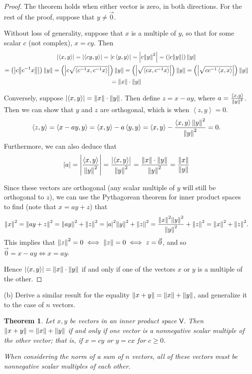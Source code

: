 \documentclass[11pt]{article}
\newcommand{\br}[1]{\left(#1\right)}
\newcommand{\abr}[1]{\left\langle#1\right\rangle}
\newtheorem*{theorem*}{Theorem}
\begin{document}
\begin{proof}
  The theorem holds when either vector is zero, in both directions. For the rest of the proof, suppose that $y\neq \vec{0}$.

  Without loss of generality, suppose that $x$ is a multiple of $y$, so that for some scalar $c$ (not complex), $x=cy$. Then \begin{multline*}\abs{\abr{x,y}} = \abs{\abr{cy,y}} = \abs{c\abr{y,y}} = \abs{c\norm{y}^2} = \br{\abs{c\norm{y}}}\norm{y} \\=\br{\abs{c\norm{c^{-1}x}}}\norm{y} = \br{\abs{c\sqrt{\abr{c^{-1}x, c^{-1}x}}}}\norm{y} = \br{\abs{\sqrt{\abr{cx, c^{-1}x}}}}\norm{y} = \br{\abs{\sqrt{cc^{-1}\abr{x, x}}}}\norm{y} \\ = \norm{x}\cdot \norm{y} \end{multline*}

  Conversely, suppose $\abs{\abr{x,y}} = \norm{x}\cdot \norm{y}$. Then define $z = x-ay$, where $a = \frac{\abr{x,y}}{\norm{y}^2}$. Then we can show that $y$ and $z$ are orthogonal, which is when $\abr{z,y} = 0$. $$\abr{z,y} = \abr{x-ay,y} = \abr{x,y} - a\abr{y,y} = \abr{x,y}-\frac{\abr{x,y}\norm{y}^2}{\norm{y}^2} = 0.$$ Furthermore, we can also deduce that $$\abs{a} = \abs{\frac{\abr{x,y}}{\norm{y}^2}} = \frac{\abs{\abr{x,y}}}{\norm{y}^2} = \frac{\norm{x}\cdot \norm{y}}{\norm{y}^2} = \frac{\norm{x}}{\norm{y}}$$ 
  
  Since these vectors are orthogonal (any scalar multiple of $y$ will still be orthogonal to $z$), we can use the Pythagorean theorem for inner product spaces to find (note that $x = ay+z$) that $$\norm{x}^2 = \norm{ay+z}^2 = \norm{ay}^2 + \norm{z}^2 = \abs{a}^2\norm{y}^2 + \norm{z}^2 = \frac{\norm{x}^2\norm{y}^2}{\norm{y}^2} + \norm{z}^2 = \norm{x}^2 + \norm{z}^2.$$ This implies that $\norm{z}^2 = 0 \iff \norm{z} = 0 \iff z = \vec{0}$, and so $\vec{0} = x-ay \iff x = ay$.

  Hence $\abs{\abr{x,y}} = \norm{x}\cdot \norm{y}$ if and only if one of the vectors $x$ or $y$ is a multiple of the other.
\end{proof}

(b) Derive a similar result for the equality $\norm{x+y} = \norm{x} + \norm{y}$, and generalize it to the case of $n$ vectors.

\begin{theorem*}
  Let $x,y$ be vectors in an inner product space $\mathsf{V}$. Then $\norm{x+y} = \norm{x} + \norm{y}$ if and only if one vector is a nonnegative scalar multiple of the other vector; that is, if $x=cy$ or $y=cx$ for $c\geq 0$.

  When considering the norm of a sum of $n$ vectors, all of these vectors must be nonnegative scalar multiples of each other.
\end{theorem*}
\end{document}

